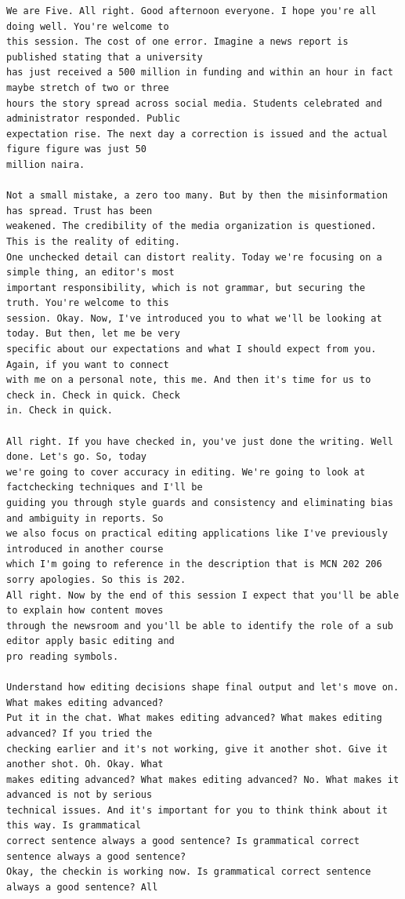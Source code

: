 {\small
\begin{Verbatim}
We are Five. All right. Good afternoon everyone. I hope you're all doing well. You're welcome to
this session. The cost of one error. Imagine a news report is published stating that a university
has just received a 500 million in funding and within an hour in fact maybe stretch of two or three
hours the story spread across social media. Students celebrated and administrator responded. Public
expectation rise. The next day a correction is issued and the actual figure figure was just 50
million naira.

Not a small mistake, a zero too many. But by then the misinformation has spread. Trust has been
weakened. The credibility of the media organization is questioned. This is the reality of editing.
One unchecked detail can distort reality. Today we're focusing on a simple thing, an editor's most
important responsibility, which is not grammar, but securing the truth. You're welcome to this
session. Okay. Now, I've introduced you to what we'll be looking at today. But then, let me be very
specific about our expectations and what I should expect from you. Again, if you want to connect
with me on a personal note, this me. And then it's time for us to check in. Check in quick. Check
in. Check in quick.

All right. If you have checked in, you've just done the writing. Well done. Let's go. So, today
we're going to cover accuracy in editing. We're going to look at factchecking techniques and I'll be
guiding you through style guards and consistency and eliminating bias and ambiguity in reports. So
we also focus on practical editing applications like I've previously introduced in another course
which I'm going to reference in the description that is MCN 202 206 sorry apologies. So this is 202.
All right. Now by the end of this session I expect that you'll be able to explain how content moves
through the newsroom and you'll be able to identify the role of a sub editor apply basic editing and
pro reading symbols.

Understand how editing decisions shape final output and let's move on. What makes editing advanced?
Put it in the chat. What makes editing advanced? What makes editing advanced? If you tried the
checking earlier and it's not working, give it another shot. Give it another shot. Oh. Okay. What
makes editing advanced? What makes editing advanced? No. What makes it advanced is not by serious
technical issues. And it's important for you to think think about it this way. Is grammatical
correct sentence always a good sentence? Is grammatical correct sentence always a good sentence?
Okay, the checkin is working now. Is grammatical correct sentence always a good sentence? All


\end{Verbatim}}
